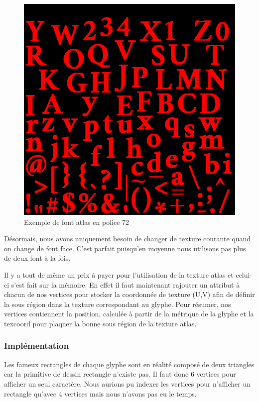 \documentclass[12pt]{article}
\begin{document}
\begin{figure}[htp]
  \centering
  \includegraphics[scale=0.8]{images/font-atlas}
  \caption{Exemple de font atlas en police 72}
  \label{fig:atlas}
\end{figure}

Désormais, nous avons uniquement besoin de changer de texture courante quand on change de font face. C'est parfait puisqu'en moyenne nous utilisons pas plus de deux font à la fois.

Il y a tout de même un prix à payer pour l'utilisation de la texture atlas et celui-ci s'est fait sur la mémoire. En effet il faut maintenant rajouter un attribut à chacun de nos vertices
pour stocker la coordonnée de texture (U,V) afin de définir la sous région dans la texture correspondant au glyphe. Pour résumer, nos vertices contiennent la position, calculée à partir de
la métrique de la glyphe et la texcoord pour plaquer la bonne sous région de la texture atlas.

\subsubsection{Implémentation}

Les fameux rectangles de chaque glyphe sont en réalité composé de deux triangles car la primitive de dessin rectangle n'existe pas. Il faut donc 6 vertices pour afficher un seul caractère.
Nous aurions pu indexer les vertices pour n'afficher un rectangle qu'avec 4 vertices mais nous n'avons pas eu le temps.
\end{document}
